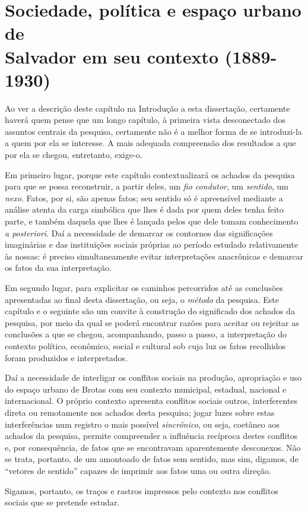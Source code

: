 \chapter[Sociedade, política e espaço urbano de Salvador em seu contexto (1889-1930)]{Sociedade, política e espaço urbano de \\Salvador em seu contexto (1889-1930)}\label{cap:1}

Ao ver a descrição deste capítulo na Introdução a esta dissertação, certamente haverá quem pense que um longo capítulo, à primeira vista desconectado dos assuntos centrais da pesquisa, certamente não é a melhor forma de se introduzi-la a quem por ela se interesse. A mais adequada compreensão dos resultados a que por ela se chegou, entretanto, exige-o.

Em primeiro lugar, porque este capítulo contextualizará os achados da pesquisa para que se possa reconstruir, a partir deles, um \textit{fio condutor}, um \textit{sentido}, um \textit{nexo}. Fatos, por si, são apenas fatos; seu sentido só é apreensível mediante a análise atenta da carga simbólica que lhes é dada por quem deles tenha feito parte, e também daquela que lhes é lançada pelos que dele tomam conhecimento \textit{a posteriori}. Daí a necessidade de demarcar os contornos das significações imaginárias e das instituições sociais próprias ao período estudado relativamente às nossas: é preciso simultaneamente evitar interpretações anacrônicas e demarcar os fatos da sua interpretação.

Em segundo lugar, para explicitar os caminhos percorridos até as conclusões apresentadas ao final desta dissertação, ou seja, o \textit{método} da pesquisa. Este capítulo e o seguinte são um convite à construção do significado dos achados da pesquisa, por meio da qual se poderá encontrar razões para aceitar ou rejeitar as conclusões a que se chegou, acompanhando, passo a passo, a interpretação do contexto político, econômico, social e cultural sob cuja luz os fatos recolhidos foram produzidos e interpretados.

Daí a necessidade de interligar os conflitos sociais na produção, apropriação e uso do espaço urbano de Brotas com seu contexto municipal, estadual, nacional e internacional. O próprio contexto apresenta conflitos sociais outros, interferentes direta ou remotamente nos achados desta pesquisa; jogar luzes sobre estas interferências num registro o mais possível \textit{sincrônico}, ou seja, coetâneo aos achados da pesquisa, permite compreender a influência recíproca destes conflitos e, por consequência, de fatos que se encontravam aparentemente desconexos. Não se trata, portanto, de um amontoado de fatos sem sentido, mas sim, digamos, de ``vetores de sentido'' capazes de imprimir aos fatos uma ou outra direção.

Sigamos, portanto, os traços e rastros impressos pelo contexto nos conflitos sociais que se pretende estudar.






